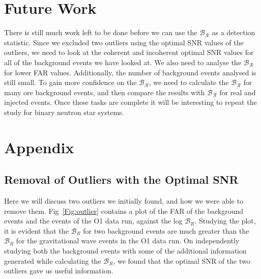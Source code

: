 \documentclass{article}
\begin{document}
  
 
 
 
 \section{Future Work }
There is still much work left to be done before we can use the $\mathcal{B_{R}}$ as a detection statistic. Since we excluded two outliers using the optimal SNR values of the outliers, we need to look at the coherent and incoherent optimal SNR values for all of the background events we have looked at. We also need to analyse the $\mathcal{B_{R}}$ for lower FAR values. Additionally, the number of background events analysed is still small. To gain more confidence on the $\mathcal{B_{R}}$, we need to calculate the $\mathcal{B_{R}}$ for many ore background events, and then compare the results with $\mathcal{B_{R}}$ for real and injected events. Once these tasks are complete it will be interesting to repeat the study for binary neutron star systems. 

   
   \section{Appendix}
  
 
 \subsection{Removal of Outliers with the Optimal SNR}
 
 \label{Appendix:Outliers}
 
 
 
 Here we will discuss two outliers we initially found, and how we were able to remove them. Fig~\ref{Fig:outlier} contains a plot of the FAR of the background events and the events of the O1 data run, against the log  $\mathcal{B}_{R}$. Studying the plot, it is evident that the $\mathcal{B}_{R}$ for two background events are much greater than the $\mathcal{B}_{R}$ for the gravitational wave events in the O1 data run.  On independently studying both the background events with some of the additional information generated while calculating the $\mathcal{B}_{R}$, we found that the optimal SNR of the two outliers gave us useful information.\\
 
\end{document}
